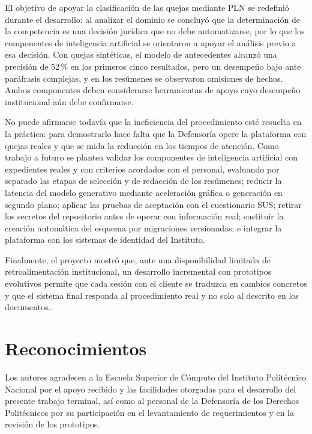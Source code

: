 \documentclass[conference,letterpaper]{IEEEtran}
\begin{document}
El objetivo de apoyar la clasificación de las quejas mediante PLN se redefinió durante el desarrollo: al analizar el dominio se concluyó que la determinación de la competencia es una decisión jurídica que no debe automatizarse, por lo que los componentes de inteligencia artificial se orientaron a apoyar el análisis previo a esa decisión. Con quejas sintéticas, el modelo de antecedentes alcanzó una precisión de 52\,\% en los primeros cinco resultados, pero un desempeño bajo ante paráfrasis complejas, y en los resúmenes se observaron omisiones de hechos. Ambos componentes deben considerarse herramientas de apoyo cuyo desempeño institucional aún debe confirmarse.

No puede afirmarse todavía que la ineficiencia del procedimiento esté resuelta en la práctica: para demostrarlo hace falta que la Defensoría opere la plataforma con quejas reales y que se mida la reducción en los tiempos de atención. Como trabajo a futuro se plantea validar los componentes de inteligencia artificial con expedientes reales y con criterios acordados con el personal, evaluando por separado las etapas de selección y de redacción de los resúmenes; reducir la latencia del modelo generativo mediante aceleración gráfica o generación en segundo plano; aplicar las pruebas de aceptación con el cuestionario SUS; retirar los secretos del repositorio antes de operar con información real; sustituir la creación automática del esquema por migraciones versionadas; e integrar la plataforma con los sistemas de identidad del Instituto.

Finalmente, el proyecto mostró que, ante una disponibilidad limitada de retroalimentación institucional, un desarrollo incremental con prototipos evolutivos permite que cada sesión con el cliente se traduzca en cambios concretos y que el sistema final responda al procedimiento real y no solo al descrito en los documentos.

\section*{Reconocimientos}

Los autores agradecen a la Escuela Superior de Cómputo del Instituto Politécnico Nacional por el apoyo recibido y las facilidades otorgadas para el desarrollo del presente trabajo terminal, así como al personal de la Defensoría de los Derechos Politécnicos por su participación en el levantamiento de requerimientos y en la revisión de los prototipos.
\end{document}
